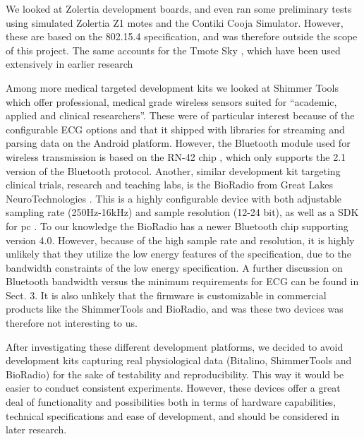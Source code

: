 We looked at Zolertia \cite{newRef_38} development boards, and even ran some preliminary tests using simulated Zolertia Z1 motes and the Contiki Cooja Simulator. However, these are based on the 802.15.4 specification, and was therefore outside the scope of this project. The same accounts for the Tmote Sky \cite{newRef_39}, which have been used extensively in earlier research \cite{Milenkovic:2006er, Owner:2006ub, ChulsungPark:2006tf, SteveWarren:2005ws, ChulsungPark:2006tf, Anonymous:GyP6wjY5}

Among more medical targeted development kits we looked at Shimmer Tools \cite{newRef_41} which offer professional, medical grade wireless sensors suited for ``academic, applied and clinical researchers''. These were of particular interest because of the configurable ECG options and that it shipped with libraries \cite{newRef_41} for streaming and parsing data on the Android platform. However, the Bluetooth module used for wireless transmission is based on the RN-42 chip \cite{newRef_43}, which only supports the 2.1 version of the Bluetooth protocol. Another, similar development kit targeting clinical trials, research and teaching labs, is the BioRadio from Great Lakes NeuroTechnologies \cite{newRef_44}. This is a highly configurable device with both adjustable sampling rate (250Hz-16kHz) and sample resolution (12-24 bit), as well as a SDK for pc \cite{newRef_45}. To our knowledge the BioRadio has a newer Bluetooth chip supporting version 4.0. However, because of the high sample rate and resolution, it is highly unlikely that they utilize the low energy features of the specification, due to the bandwidth constraints of the low energy specification. A further discussion on Bluetooth bandwidth versus the minimum requirements for ECG can be found in Sect. 3. It is also unlikely that the firmware is customizable in commercial products like the ShimmerTools and BioRadio, and was these two devices was therefore not interesting to us.

After investigating these different development platforms, we decided to avoid development kits capturing real physiological data (Bitalino, ShimmerTools and BioRadio) for the sake of testability and reproducibility. This way it would be easier to conduct consistent experiments. However, these devices offer a great deal of functionality and possibilities both in terms of hardware capabilities, technical specifications and ease of development, and should be considered in later research.

